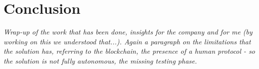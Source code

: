 \newpage
\chapter{Conclusion}
\label{cha:conclusion}
\textit{Wrap-up of the work that has been done, insights for the company and for me (by working on this we understood that...). Again a paragraph on the limitations that the solution has, referring to the blockchain, the presence of a human protocol - so the solution is not fully autonomous, the missing testing phase. }



